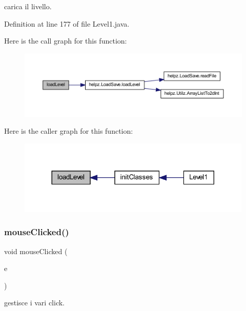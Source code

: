 carica il livello. 



Definition at line 177 of file Level1.\+java.

Here is the call graph for this function\+:
\nopagebreak
\begin{figure}[H]
\begin{center}
\leavevmode
\includegraphics[width=350pt]{classscenes_1_1_level1_a286931cc46e197f4a85af7229fdc29a4_cgraph}
\end{center}
\end{figure}
Here is the caller graph for this function\+:\nopagebreak
\begin{figure}[H]
\begin{center}
\leavevmode
\includegraphics[width=317pt]{classscenes_1_1_level1_a286931cc46e197f4a85af7229fdc29a4_icgraph}
\end{center}
\end{figure}
\mbox{\label{classscenes_1_1_level1_a45d56bd84238e8b56589dfc732e2b2cf}} 
\subsubsection{\texorpdfstring{mouse\+Clicked()}{mouseClicked()}}
{\footnotesize\ttfamily void mouse\+Clicked (\begin{DoxyParamCaption}\item[{Mouse\+Event}]{e }\end{DoxyParamCaption})}



gestisce i vari click. 


